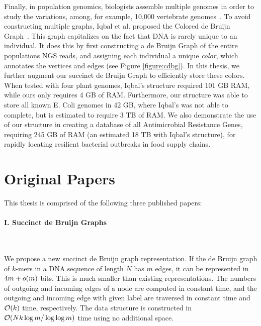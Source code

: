 Finally, in population genomics, biologists assemble multiple genomes in order to study the variations, among, for example, 10,000 vertebrate genomes~\citep{Haussler:2009}. To avoid constructing multiple graphs, Iqbal et al. proposed the Colored de Bruijn Graph~\cite{ICTFM12}. This graph capitalizes on the fact that DNA is rarely unique to an individual. It does this by first constructing a de Bruijn Graph of the entire populations NGS reads, and assigning each individual a unique \emph{color}, which annotates the vertices and edges (see Figure \ref{figure:cdbg}). In this thesis, we further augment our succinct de Bruijn Graph to efficiently store these colors. When tested with four plant genomes, Iqbal’s structure required 101 GB RAM, while ours only requires 4 GB of RAM. Furthermore, our structure was able to store all known E. Coli genomes in 42 GB, where Iqbal’s was not able to complete, but is estimated to require 3 TB of RAM. We also demonstrate the use of our structure in creating a database of all Antimicrobial Resistance Genes, requiring 245 GB of RAM (an estimated 18 TB with Iqbal’s structure), for rapidly locating resilient bacterial outbreaks in food supply chains.



\section{Original Papers}

This thesis is comprised of the following three published papers:


\paragraph{I. Succinct de Bruijn Graphs} \

\noindent
We propose a new succinct de Bruijn graph representation.  
If the de Bruijn graph of $k$-mers in a DNA sequence of length $N$ has $m$ edges,
it can be represented in $4m + o(m)$ bits.
This is much smaller than existing representations.
The numbers of outgoing and incoming edges of a node are computed in constant time, and
the outgoing and incoming edge with given label are traversed in constant time
and $\mathcal{O}(k)$ time, respectively.
The data structure is constructed in $\mathcal{O}(Nk \log m/\log\log m)$
time using no additional space.

